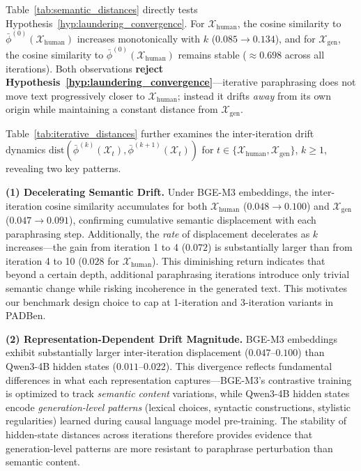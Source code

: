 \documentclass[runningheads]{llncs}
\begin{document}
\noindent Table~\ref{tab:semantic_distances} directly tests 
Hypothesis~\ref{hyp:laundering_convergence}. For 
$\mathcal{X}_{\text{human}}$, the cosine similarity to 
$\bar{\phi}^{(0)}(\mathcal{X}_{\text{human}})$ increases monotonically 
with $k$ ($0.085 \to 0.134$), and for $\mathcal{X}_{\text{gen}}$, 
the cosine similarity to $\bar{\phi}^{(0)}(\mathcal{X}_{\text{human}})$ remains 
stable ($\approx 0.698$ across all iterations). Both observations 
\textbf{reject Hypothesis~\ref{hyp:laundering_convergence}}---iterative 
paraphrasing does not move text progressively closer to 
$\mathcal{X}_{\text{human}}$; instead it drifts \textit{away} from its 
own origin while maintaining a constant distance from 
$\mathcal{X}_{\text{gen}}$.

\noindent Table~\ref{tab:iterative_distances} further examines the 
inter-iteration drift dynamics 
$\text{dist}(\bar{\phi}^{(k)}(\mathcal{X}_t), \bar{\phi}^{(k+1)}(\mathcal{X}_t))$ 
for $t \in \{\mathcal{X}_{\text{human}}, \mathcal{X}_{\text{gen}}\}$, 
$k \geq 1$, revealing two key patterns.

\noindent\textbf{(1) Decelerating Semantic Drift.} Under BGE-M3 
embeddings, the inter-iteration cosine similarity accumulates for both $\mathcal{X}_{\text{human}}$ ($0.048 \to 0.100$) 
and $\mathcal{X}_{\text{gen}}$ ($0.047 \to 0.091$), confirming 
cumulative semantic displacement with each paraphrasing step. Additionally, the \textit{rate} of displacement decelerates as $k$ 
increases---the gain from iteration 1 to 4 ($0.072$) is substantially 
larger than from iteration 4 to 10 ($0.028$ for 
$\mathcal{X}_{\text{human}}$). This diminishing return indicates that 
beyond a certain depth, additional paraphrasing iterations introduce 
only trivial semantic change while risking incoherence in the generated 
text. This motivates our benchmark design choice to cap at 
1-iteration and 3-iteration variants in PADBen.

\noindent\textbf{(2) Representation-Dependent Drift Magnitude.} 
BGE-M3 embeddings exhibit substantially larger inter-iteration 
displacement ($0.047$--$0.100$) than Qwen3-4B hidden states 
($0.011$--$0.022$). This divergence reflects fundamental differences 
in what each representation captures---BGE-M3's contrastive training 
is optimized to track \textit{semantic content} variations, while 
Qwen3-4B hidden states encode \textit{generation-level patterns} 
(lexical choices, syntactic constructions, stylistic regularities) 
learned during causal language model pre-training. The stability of 
hidden-state distances across iterations therefore provides evidence 
that generation-level patterns are more resistant to paraphrase 
perturbation than semantic content.
\end{document}
